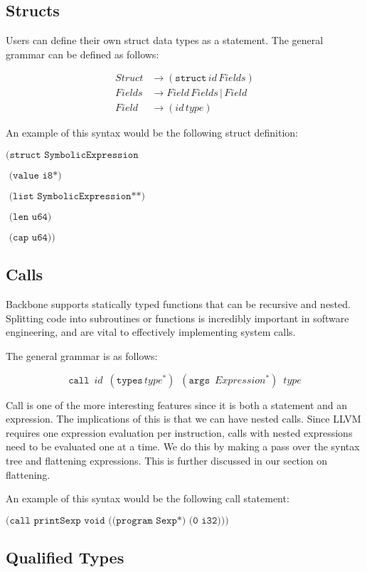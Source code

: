 \documentclass[journal=jacsat, manuscript=article]{achemso}
\begin{document}
\subsection{Structs}

Users can define their own struct data types as a statement. The general
grammar can be defined as follows:

\begin{align}
Struct &\rightarrow (\texttt{struct}\,id\,Fields) \\
Fields &\rightarrow Field\,Fields\,|\,Field \\
Field  &\rightarrow (id\,type)
\end{align}

An example of this syntax would be the following struct definition:

$\texttt{(struct SymbolicExpression}$

$\texttt{  (value i8*)}$

$\texttt{  (list SymbolicExpression**)}$

$\texttt{  (len u64)}$

$\texttt{  (cap u64))}$

\subsection{Calls}

Backbone supports statically typed functions that can be recursive and nested. Splitting code into
subroutines or functions is incredibly important in software engineering, and are vital to effectively
implementing system calls.

The general grammar is as follows:

$$\texttt{call}\,\,\,id\,\,\,(\texttt{types}\,type^*)\,\,\,(\texttt{args}\,\,\,Expression^*)\,\,\,type$$

Call is one of the more interesting features since it is both a statement and an expression.
The implications of this is that we can have nested calls. Since LLVM requires one expression evaluation
per instruction, calls with nested expressions need to be evaluated one at a time. We do this by
making a pass over the syntax tree and flattening expressions. This is further discussed in our section
on flattening.

An example of this syntax would be the following call statement:

$\texttt{(call printSexp void ((program Sexp*) (0 i32)))}$

\subsection{Qualified Types}
\end{document}
